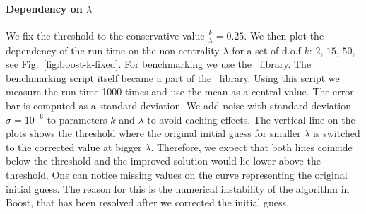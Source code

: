 \documentclass[final,5p,twocolumn,times,authoryear]{elsarticle}
\begin{document}
\paragraph{Dependency on $\lambda$} We fix the threshold to the conservative value  $\frac{k}{\lambda} = 0.25$. We then plot the dependency of the run time on the non-centrality $\lambda$ for a set of d.o.f $k$: $2$, $15$, $50$, see Fig.~\ref{fig:boost-k-fixed}. For benchmarking we use the~\cite{gbenchmark} library. The benchmarking script itself became a part of the~\cite{gbench-script} library. Using this script we measure the run time 1000 times and use the mean as a central value. The error bar is computed as a standard deviation. We add noise with standard deviation $\sigma = 10^{-6}$ to parameters $k$ and $\lambda$ to avoid caching effects. The vertical line on the plots shows the threshold where the original initial guess for smaller $\lambda$ is switched to the corrected value at bigger $\lambda$. Therefore, we expect that both lines coincide below the threshold and the improved solution would lie lower above the threshold. One can notice missing values on the curve representing the original initial guess. The reason for this is the numerical instability of the algorithm in Boost, that has been resolved after we corrected the initial guess.
%
\end{document}
